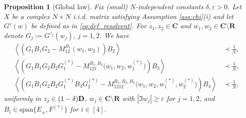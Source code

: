 \documentclass[10pt]{amsart}
\newtheorem{proposition}[theorem]{Proposition}
\numberwithin{equation}{section}
\newcommand{\R}{\mathbf{R}}
\newcommand{\C}{\mathbf{C}}
\begin{document}
\begin{proposition}[Global law]\label{prop:global_law} Fix (small) $N$-independent constants $\delta, \varepsilon>0$. Let $X$ be a complex $N\times N$ i.i.d. matrix satisfying Assumption \ref{ass:chi}(i) and let $G^z(w)$ be defined as in \eqref{eq:def_resolvent}. For $z_1,z_2\in\C$ and $w_1,w_2\in\C\setminus\R$ denote $G_j:=G^{z_j}(w_j)$, $j=1,2$. We have
\begin{align}
\left\langle \left(G_1B_1G_2-M_{12}^{B_1}(w_1,w_2)\right)B_2\right\rangle&\prec \frac{1}{N},\label{eq:global_2G}\\
\left\langle \left(G_1B_1G_2B_2G_1^{(*)}-M_{121}^{B_1,B_2}\big(w_1,w_2,w_1^{(*)}\big)\right)B_3\right\rangle&\prec \frac{1}{N},\label{eq:global_3G}\\
\left\langle \left(G_1B_1G_2B_2G_1^{(*)}B_3G_2^{(*)}-M_{1212}^{B_1,B_2,B_3}\big(w_1,w_2,w_1^{(*)},w_2^{(*)}\big)\right)B_4\right\rangle&\prec \frac{1}{N},\label{eq:global_4G}
\end{align}
uniformly in $z_j\in(1-\delta)\bf{D}$, $w_j\in\C\setminus\R$ with $|\Im w_j|\ge \varepsilon$ for $j=1,2$, and $B_i\in\mathrm{span}\{E_{\pm},F^{(*)}\}$ for $i\in [4]$.
\end{proposition}
\end{document}
